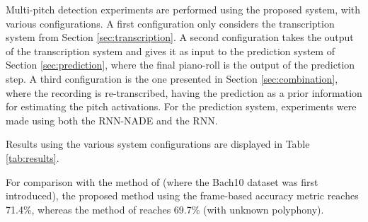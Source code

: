 Multi-pitch detection experiments are performed using the proposed system, with various configurations. A first configuration only considers the transcription system from Section \ref{sec:transcription}. A second configuration takes the output of the transcription system and gives it as input to the prediction system of Section \ref{sec:prediction}, where the final piano-roll is the output of the prediction step. A third configuration is the one presented in Section \ref{sec:combination}, where the recording is re-transcribed, having the prediction as a prior information for estimating the pitch activations. For the prediction system, experiments were made using both the RNN-NADE and the RNN.

Results using the various system configurations are displayed in Table \ref{tab:results}.

For comparison with the method of \cite{Duan2010} (where the Bach10 dataset was first introduced), the proposed method using the frame-based accuracy metric reaches 71.4\%, whereas the method of \cite{Duan2010} reaches 69.7\% (with unknown polyphony). 

\begin{table}[t]
 \begin{center}
\end{center}
 \caption{Transcription results using various system configurations.}
 \label{tab:results}
\end{table}

